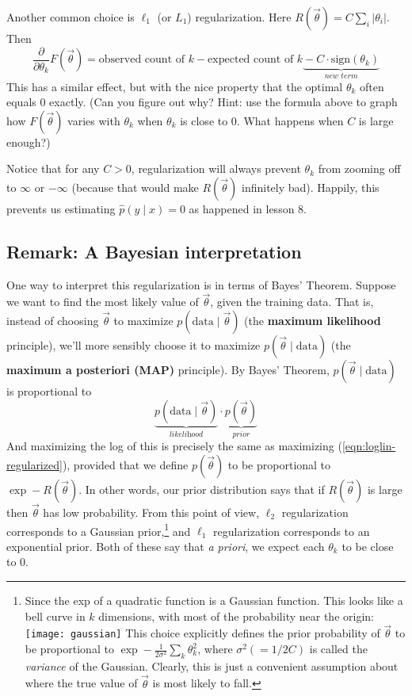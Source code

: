 \documentclass[11pt]{article}
\newcommand{\vtheta}{\vec{\theta}}
\newcommand{\ph}{\hat{p}}
\newcommand{\diffk}{\frac{\partial}{\partial \theta_k}}
\begin{document}
Another common choice is $\ell_1$ (or $L_1$) regularization.  Here 
$R(\vtheta) = C \sum_i |\theta_i|$.  Then
\begin{equation}
  \diffk F(\vtheta) = \textrm{observed count of $k$} -
  \textrm{expected count of $k$} \underbrace{\mbox{}-C\cdot \textrm{sign}(\theta_k)}_{\textit{new term}}
\end{equation}
This has a similar effect, but with the nice property that the optimal
$\theta_k$ often equals 0 exactly.  (Can you figure out why?  Hint:
use the formula above to graph how $F(\vtheta)$ varies with $\theta_k$ when
$\theta_k$ is close to 0.  What happens when $C$ is large enough?)

Notice that for any $C > 0$, regularization will always prevent
$\theta_k$ from zooming off to $\infty$ or $-\infty$ (because that
would make $R(\vtheta)$ infinitely bad).  Happily, this prevents us
estimating $\ph(y\mid x)=0$ as happened in lesson 8.

\subsection{Remark: A Bayesian interpretation}

One way to interpret this regularization is in terms of Bayes'
Theorem.  Suppose we want to find the most likely value of $\vtheta$,
given the training data.  That is, instead of choosing $\vtheta$ to
maximize $p(\textrm{data} \mid \vtheta)$ (the {\bf maximum likelihood}
principle), we'll more sensibly choose it to maximize $p(\vtheta \mid
\textrm{data})$ (the {\bf maximum a posteriori (MAP)} principle).  By
Bayes' Theorem, $p(\vtheta \mid \textrm{data})$ is proportional to
\begin{equation}
\underbrace{p(\textrm{data} \mid \vtheta)}_{\textit{likelihood}} \cdot \underbrace{p(\vtheta)}_{\textit{prior}} 
\end{equation}
And maximizing the log of this is precisely the same as maximizing
(\ref{eqn:loglin-regularized}), provided that we define $p(\vtheta)$
to be proportional to $\exp -R(\vtheta)$.  In other words, our prior
distribution says that if $R(\vtheta)$ is large then $\vtheta$ has low
probability.  From this point of view, $\ell_2$ regularization
corresponds to a Gaussian prior,\footnote{Since the exp of a quadratic
  function is a Gaussian function.  This looks like a bell curve in
  $k$ dimensions, with most of the probability near the
  origin: \texttt{[image: gaussian]} This choice explicitly defines the prior
  probability of $\vtheta$ to be proportional to $\exp -\frac{1}{2\sigma^2} \sum_k
  \theta_k^2$, where $\sigma^2 (= 1/2C)$ is called the {\em variance} of the
  Gaussian.  Clearly, this is just a convenient assumption about
  where the true value of $\vtheta$ is most likely to fall.%
}  and $\ell_1$
regularization corresponds to an exponential prior.  Both of these say
that {\em a priori}, we expect each $\theta_k$ to be close to 0.
\end{document}
